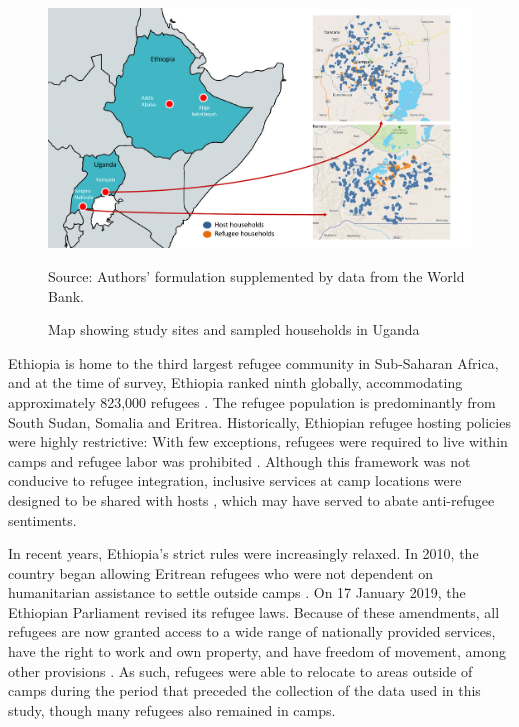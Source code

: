 \documentclass[a4paper,12pt]{article}
\renewcommand{\footnotesize}{\fontsize{8pt}{9pt}\selectfont}
\begin{document}
\vspace{5mm}

              \begin{center}
\begin{figure}[H]
	\footnotesize
          \caption{Map showing study sites and sampled households in Uganda}
          \label{fig:map_uganda}
          \centering
        \includegraphics[height=0.6\textwidth]{Figures/FIG2_Map_Uganda.pdf} \\
        \begin{minipage}{0.65\textwidth}
 { \footnotesize Source: Authors' formulation supplemented by data from the World Bank. \par}
\end{minipage}
 \end{figure} 
\vspace{5mm}
   \end{center}
   
  
    
Ethiopia is home to the third largest refugee community in Sub-Saharan Africa, and at the time of survey, Ethiopia ranked ninth globally, accommodating approximately 823,000 refugees \citep{UNHCRreport2021}. The refugee population is predominantly from South Sudan, Somalia and Eritrea. Historically, Ethiopian refugee hosting policies were highly restrictive: With few exceptions, refugees were required to live within camps and refugee labor was prohibited \citep{betts2019Addis}. Although this framework was not conducive to refugee integration, inclusive services at camp locations were designed to be shared with hosts \citep{jahre2018approaches}, which may have served to abate anti-refugee sentiments. 
    
In recent years, Ethiopia's strict rules were increasingly relaxed. In 2010, the country began allowing Eritrean refugees who were not dependent on humanitarian assistance to settle outside camps \citep{abebe2018promises, betts2023refugees}. On 17 January 2019, the Ethiopian Parliament revised its refugee laws. Because of these amendments, all refugees are now granted access to a wide range of nationally provided services, have the right to work and own property, and have freedom of movement, among other provisions \citep{UNHCR2020ecrrp}. As such, refugees were able to relocate to areas outside of camps during the period that preceded the collection of the data used in this study, though many refugees also remained in camps.  
   
\end{document}
